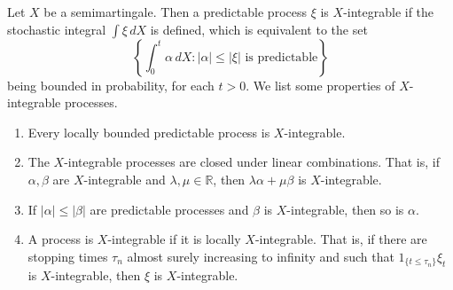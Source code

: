 \documentclass[12pt]{article}
\begin{document}

Let $X$ be a semimartingale. Then a predictable process $\xi$ is $X$-integrable if the stochastic integral $\int\xi\,dX$ is defined, which is equivalent to the set
\begin{equation*}
\left\{\int_0^t\alpha\,dX:|\alpha|\le |\xi|\textrm{ is predictable}\right\}
\end{equation*}
being bounded in probability, for each $t>0$. We list some properties of $X$-integrable processes.

\begin{enumerate}
\item Every locally bounded predictable process is $X$-integrable.
\item The $X$-integrable processes are closed under linear combinations. That is, if $\alpha,\beta$ are $X$-integrable and $\lambda,\mu\in\mathbb{R}$, then $\lambda\alpha+\mu\beta$ is $X$-integrable.
\item If $|\alpha|\le|\beta|$ are predictable processes and $\beta$ is $X$-integrable, then so is $\alpha$.
\item A process is $X$-integrable if it is locally $X$-integrable. That is, if there are stopping times $\tau_n$ almost surely increasing to infinity and such that $1_{\{t\le\tau_n\}}\xi_t$ is $X$-integrable, then $\xi$ is $X$-integrable.
\end{enumerate}

\end{document}
